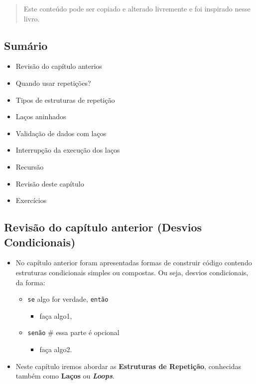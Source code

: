 \documentclass[12pt,a4paper]{article}
\providecommand{\tightlist}{%
      \setlength{\itemsep}{0pt}\setlength{\parskip}{0pt}}
\begin{document}
\begin{quote}
Este conteúdo pode ser copiado e alterado livremente e foi inspirado
nesse livro.
\end{quote}

    \hypertarget{sumuxe1rio}{%
\subsection{Sumário}\label{sumuxe1rio}}

\begin{itemize}
\tightlist
\item
  Revisão do capítulo anterios
\item
  Quando usar repetições?
\item
  Tipos de estruturas de repetição
\item
  Laços aninhados
\item
  Validação de dados com laços
\item
  Interrupção da execução dos laços
\item
  Recursão
\item
  Revisão deste capítulo
\item
  Exercícios
\end{itemize}

    \hypertarget{revisuxe3o-do-capuxedtulo-anterior-desvios-condicionais}{%
\subsection{Revisão do capítulo anterior (Desvios
Condicionais)}\label{revisuxe3o-do-capuxedtulo-anterior-desvios-condicionais}}

    \begin{itemize}
\item
  No capítulo anterior foram apresentadas formas de construir código
  contendo estruturas condicionais simples ou compostas. Ou seja,
  desvios condicionais, da forma:

  \begin{itemize}
  \tightlist
  \item
    \texttt{se} algo for verdade, \texttt{então}

    \begin{itemize}
    \tightlist
    \item
      faça algo1,
    \end{itemize}
  \item
    \texttt{senão} \# essa parte é opcional

    \begin{itemize}
    \tightlist
    \item
      faça algo2.
    \end{itemize}
  \end{itemize}
\item
  Neste capítulo iremos abordar as \textbf{Estruturas de Repetição},
  conhecidas também como \textbf{Laços} ou \textbf{\emph{Loops}}.
\end{itemize}
\end{document}
